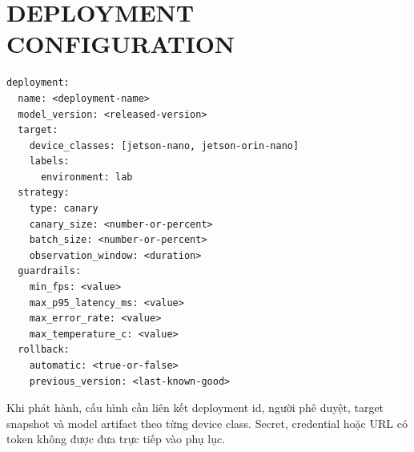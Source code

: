 \chapter{DEPLOYMENT CONFIGURATION}

\begin{lstlisting}[caption={Mẫu cấu hình deployment}]
deployment:
  name: <deployment-name>
  model_version: <released-version>
  target:
    device_classes: [jetson-nano, jetson-orin-nano]
    labels:
      environment: lab
  strategy:
    type: canary
    canary_size: <number-or-percent>
    batch_size: <number-or-percent>
    observation_window: <duration>
  guardrails:
    min_fps: <value>
    max_p95_latency_ms: <value>
    max_error_rate: <value>
    max_temperature_c: <value>
  rollback:
    automatic: <true-or-false>
    previous_version: <last-known-good>
\end{lstlisting}

Khi phát hành, cấu hình cần liên kết deployment id, người phê duyệt, target
snapshot và model artifact theo từng device class. Secret, credential hoặc URL có
token không được đưa trực tiếp vào phụ lục.